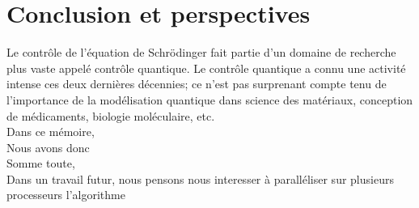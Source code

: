 \chapter*{Conclusion et perspectives}

Le contrôle de l’équation de Schrödinger fait partie d’un domaine de recherche plus vaste appelé contrôle quantique. Le contrôle quantique a connu une activité intense ces deux dernières décennies; ce n'est pas surprenant compte tenu de l'importance de la modélisation quantique dans science des matériaux, conception de médicaments, biologie moléculaire, etc.\\
Dans ce mémoire, \\
Nous avons donc \\
Somme toute,\\

Dans un travail futur, nous pensons nous interesser à paralléliser sur plusieurs processeurs l'algorithme 